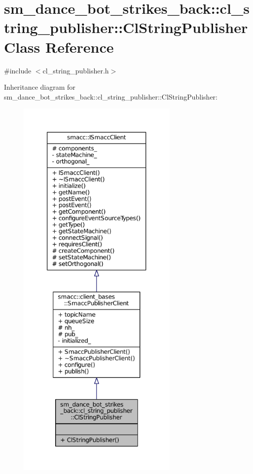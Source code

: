 \hypertarget{classsm__dance__bot__strikes__back_1_1cl__string__publisher_1_1ClStringPublisher}{}\section{sm\+\_\+dance\+\_\+bot\+\_\+strikes\+\_\+back\+:\+:cl\+\_\+string\+\_\+publisher\+:\+:Cl\+String\+Publisher Class Reference}
\label{classsm__dance__bot__strikes__back_1_1cl__string__publisher_1_1ClStringPublisher}


{\ttfamily \#include $<$cl\+\_\+string\+\_\+publisher.\+h$>$}



Inheritance diagram for sm\+\_\+dance\+\_\+bot\+\_\+strikes\+\_\+back\+:\+:cl\+\_\+string\+\_\+publisher\+:\+:Cl\+String\+Publisher\+:
\nopagebreak
\begin{figure}[H]
\begin{center}
\leavevmode
\includegraphics[height=550pt]{classsm__dance__bot__strikes__back_1_1cl__string__publisher_1_1ClStringPublisher__inherit__graph}
\end{center}
\end{figure}


